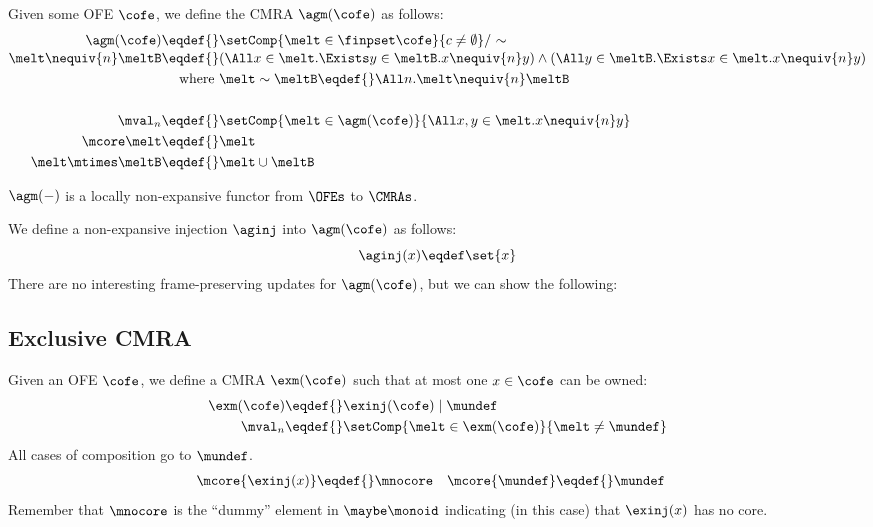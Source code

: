 Given some OFE $\cofe$, we define the CMRA $\agm(\cofe)$ as follows:
\begin{align*}
  \agm(\cofe) \eqdef{}& \setComp{\melt \in \finpset\cofe}{c \neq \emptyset} /\ {\sim} \\[-0.2em]
  \melt \nequiv{n} \meltB \eqdef{}& (\All x \in \melt. \Exists y \in \meltB. x \nequiv{n} y) \land (\All y \in \meltB. \Exists x \in \melt. x \nequiv{n} y) \\
  \textnormal{where }& \melt \sim \meltB \eqdef{} \All n. \melt \nequiv{n} \meltB  \\
~\\
  \mval_n \eqdef{}& \setComp{\melt \in \agm(\cofe)}{ \All x, y \in \melt. x \nequiv{n} y } \\
  \mcore\melt \eqdef{}& \melt \\
  \melt \mtimes \meltB \eqdef{}& \melt \cup \meltB
\end{align*}

$\agm(-)$ is a locally non-expansive functor from $\OFEs$ to $\CMRAs$.

We define a non-expansive injection $\aginj$ into $\agm(\cofe)$ as follows:
\[ \aginj(x) \eqdef \set{x} \]
There are no interesting frame-preserving updates for $\agm(\cofe)$, but we can show the following:
\begin{mathpar}

  
\end{mathpar}


\subsection{Exclusive CMRA}

Given an OFE $\cofe$, we define a CMRA $\exm(\cofe)$ such that at most one $x \in \cofe$ can be owned:
\begin{align*}
  \exm(\cofe) \eqdef{}& \exinj(\cofe) \mid \mundef \\
  \mval_n \eqdef{}& \setComp{\melt\in\exm(\cofe)}{\melt \neq \mundef}
\end{align*}
All cases of composition go to $\mundef$.
\begin{align*}
  \mcore{\exinj(x)} \eqdef{}& \mnocore &
  \mcore{\mundef} \eqdef{}& \mundef
\end{align*}
Remember that $\mnocore$ is the ``dummy'' element in $\maybe\monoid$ indicating (in this case) that $\exinj(x)$ has no core.

